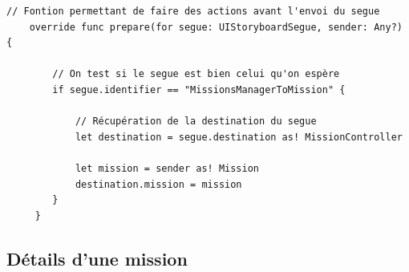 \documentclass{article}
\begin{document}
\begin{verbatim}
// Fontion permettant de faire des actions avant l'envoi du segue
    override func prepare(for segue: UIStoryboardSegue, sender: Any?) {
        
        // On test si le segue est bien celui qu'on espère
        if segue.identifier == "MissionsManagerToMission" {
            
            // Récupération de la destination du segue
            let destination = segue.destination as! MissionController
            
            let mission = sender as! Mission
            destination.mission = mission
        }
     }
\end{verbatim}

\newpage

\subsection{Détails d'une mission}
\end{document}
